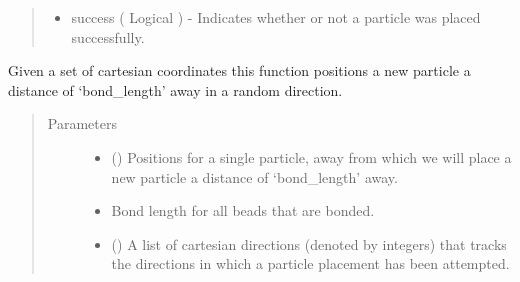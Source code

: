 \documentclass[letterpaper,12pt,english,openany,oneside]{sphinxmanual}
\begin{document}
\begin{fulllineitems}
\begin{quote}
\begin{description}
\begin{itemize}
\item {} 
success ( Logical ) - Indicates whether or not a particle was placed successfully.

\end{itemize}


\end{description}\end{quote}

\end{fulllineitems}


\begin{fulllineitems}
\label{\detokenize{utilities:utilities.util.attempt_lattice_move}}
Given a set of cartesian coordinates this function positions a new particle a distance of ‘bond\_length’ away in a random direction.
\begin{quote}\begin{description}
\item[{Parameters}] \leavevmode\begin{itemize}
\item {} 
 (\sphinxstyleliteralemphasis{\sphinxupquote{( }}\sphinxstyleliteralemphasis{\sphinxupquote{ ( }}\sphinxstyleliteralemphasis{\sphinxupquote{ ) }}\sphinxstyleliteralemphasis{\sphinxupquote{)}}) \textendash{} Positions for a single particle, away from which we will place a new particle a distance of ‘bond\_length’ away.

\item {} 
 \textendash{} Bond length for all beads that are bonded.

\item {} 
 (\sphinxstyleliteralemphasis{\sphinxupquote{( }}\sphinxstyleliteralemphasis{\sphinxupquote{ )}}) \textendash{} A list of cartesian directions (denoted by integers) that tracks the directions in which a particle placement has been attempted.


\end{itemize}
\end{description}
\end{quote}
\end{fulllineitems}
\end{document}
